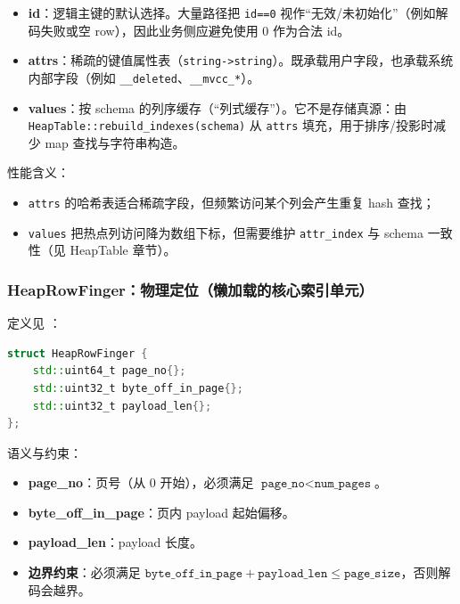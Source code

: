 \begin{itemize}
  \item \textbf{id}：逻辑主键的默认选择。大量路径把 \texttt{id==0} 视作“无效/未初始化”（例如解码失败或空 row），因此业务侧应避免使用 0 作为合法 id。
  \item \textbf{attrs}：稀疏的键值属性表（\texttt{string->string}）。既承载用户字段，也承载系统内部字段（例如 \texttt{\_\_deleted}、\texttt{\_\_mvcc\_*}）。
  \item \textbf{values}：按 schema 的列序缓存（“列式缓存”）。它不是存储真源：由 \texttt{HeapTable::rebuild\_indexes(schema)} 从 \texttt{attrs} 填充，用于排序/投影时减少 map 查找与字符串构造。
\end{itemize}

性能含义：

\begin{itemize}
  \item \texttt{attrs} 的哈希表适合稀疏字段，但频繁访问某个列会产生重复 hash 查找；
  \item \texttt{values} 把热点列访问降为数组下标，但需要维护 \texttt{attr\_index} 与 schema 一致性（见 HeapTable 章节）。
\end{itemize}

\subsubsection{HeapRowFinger：物理定位（懒加载的核心索引单元）}

定义见 ：

\begin{lstlisting}[language=C++,caption={HeapRowFinger（原型）}]
struct HeapRowFinger {
    std::uint64_t page_no{};
    std::uint32_t byte_off_in_page{};
    std::uint32_t payload_len{};
};
\end{lstlisting}

语义与约束：

\begin{itemize}
  \item \textbf{page\_no}：页号（从 0 开始），必须满足 \(\texttt{page\_no} < \texttt{num\_pages}\)。
  \item \textbf{byte\_off\_in\_page}：页内 payload 起始偏移。
  \item \textbf{payload\_len}：payload 长度。
  \item \textbf{边界约束}：必须满足 \(\texttt{byte\_off\_in\_page} + \texttt{payload\_len} \le \texttt{page\_size}\)，否则解码会越界。
\end{itemize}

